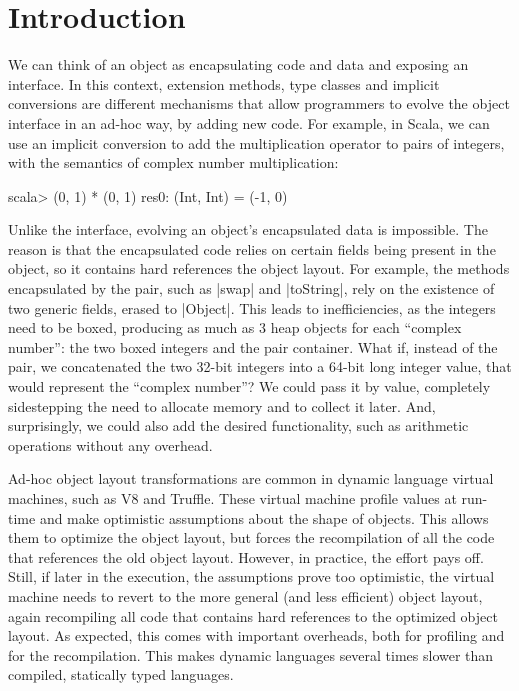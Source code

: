\section{Introduction}
\label{sec:intro}

We can think of an object as encapsulating code and data and exposing an interface. In this context, extension methods, type classes and implicit conversions are different mechanisms that allow programmers to evolve the object interface in an ad-hoc way, by adding new code. For example, in Scala, we can use an implicit conversion to add the multiplication operator to pairs of integers, with the semantics of complex number multiplication:

\begin{lstlisting-nobreak}
scala> (0, 1) * (0, 1)
res0: (Int, Int) = (-1, 0)
\end{lstlisting-nobreak}

Unlike the interface, evolving an object's encapsulated data is impossible. The reason is that the encapsulated code relies on certain fields being present in the object, so it contains hard references the object layout. For example, the methods encapsulated by the pair, such as |swap| and |toString|, rely on the existence of two generic fields, erased to |Object|. This leads to inefficiencies, as the integers need to be boxed, producing as much as 3 heap objects for each ``complex number'': the two boxed integers and the pair container. What if, instead of the pair, we concatenated the two 32-bit integers into a 64-bit long integer value, that would represent the ``complex number''? We could pass it by value, completely sidestepping the need to allocate memory and to collect it later. And, surprisingly, we could also add the desired functionality, such as arithmetic operations without any overhead.

Ad-hoc object layout transformations are common in dynamic language virtual machines, such as V8 and Truffle. These virtual machine profile values at run-time and make optimistic assumptions about the shape of objects. This allows them to optimize the object layout, but forces the recompilation of all the code that references the old object layout. However, in practice, the effort pays off. Still, if later in the execution, the assumptions prove too optimistic, the virtual machine needs to revert to the more general (and less efficient) object layout, again recompiling all code that contains hard references to the optimized object layout. As expected, this comes with important overheads, both for profiling and for the recompilation. This makes dynamic languages several times slower than compiled, statically typed languages.

